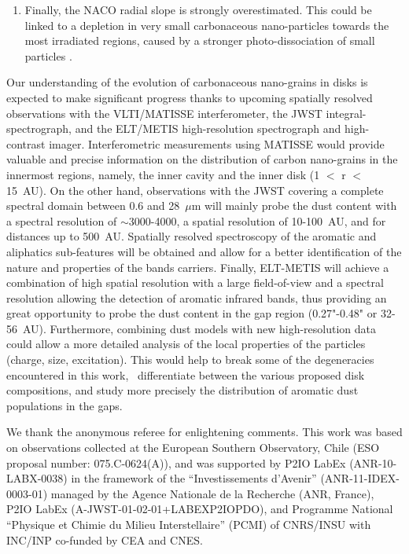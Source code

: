 \documentclass{aa}
\begin{document}
\begin{enumerate}
\item Finally, the NACO radial slope is strongly overestimated. This could be linked to a depletion in very small carbonaceous nano-particles towards the most irradiated regions, caused by a stronger photo-dissociation of small particles \citep{Schirmer2020}. 
\end{enumerate}

Our understanding of the evolution of carbonaceous nano-grains in disks is expected to make significant progress thanks to upcoming spatially resolved observations with the VLTI/MATISSE interferometer, the JWST integral-spectrograph, and the ELT/METIS high-resolution spectrograph and high-contrast imager.
Interferometric measurements using MATISSE would provide valuable and precise information on the distribution of carbon nano-grains in the innermost regions, namely, the inner cavity and the inner disk (1 $<$ r $<$ 15~AU). 
On the other hand, observations with the JWST covering a complete spectral domain between 0.6 and 28~$\mu$m will mainly probe the dust content with a spectral resolution of $\sim$3000-4000, a spatial resolution of 10-100~AU, and for distances up to 500~AU. Spatially resolved spectroscopy of the aromatic and aliphatics sub-features will be obtained and allow for a better identification of the nature and properties of the bands carriers. 
Finally, ELT-METIS will achieve a combination of high spatial resolution with a large field-of-view and a spectral resolution allowing the detection of aromatic infrared bands, thus providing an great opportunity to probe the dust content in the gap region (0.27"-0.48" or 32-56~AU).
Furthermore, combining dust models with new high-resolution data could allow a more detailed analysis of the local properties of the particles (charge, size, excitation). This would help to break some of the degeneracies encountered in this work, \ differentiate between the various proposed disk compositions, and study more precisely the distribution of aromatic dust populations in the gaps.

\begin{acknowledgements} 
We thank the anonymous referee for enlightening comments. This work was based on observations collected at the European Southern Observatory, Chile (ESO proposal number: 075.C-0624(A)), and was supported by P2IO LabEx (ANR-10-LABX-0038) in the framework of the “Investissements d’Avenir” (ANR-11-IDEX-0003-01) managed by the Agence Nationale de la Recherche (ANR, France), P2IO LabEx (A-JWST-01-02-01+LABEXP2IOPDO), and Programme National “Physique et Chimie du Milieu Interstellaire” (PCMI) of CNRS/INSU with INC/INP co-funded by CEA and CNES.
\end{acknowledgements}



\end{document}
